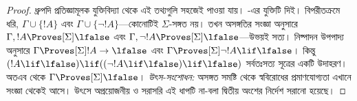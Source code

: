 \documentclass[../../../include/open-logic-section]{subfiles}
\begin{document}
\begin{proof}
  ধ্রুপদি প্রতিজ্ঞামূলক যুক্তিবিদ্যা থেকে এই তথ্যগুলি সহজেই পাওয়া যায়। -এর যুক্তিটি দিই। বিপরীতক্রমে ধরি, $\Gamma \cup \{ !A \}$ এবং $\Gamma \cup \{ \lnot!A \}$—কোনোটিই $\Sigma$-সঙ্গত নয়। তখন অসঙ্গতির সংজ্ঞা অনুসারে $\Gamma, !A \Proves[\Sigma] \lfalse$ এবং $\Gamma, \lnot !A \Proves[\Sigma] \lfalse$—উভয়ই সত্য। নিষ্পাদন উপপাদ্য অনুসারে $\Gamma \Proves[\Sigma] !A \to \lfalse$ এবং $\Gamma \Proves[\Sigma] \lnot!A \lif \lfalse$। কিন্তু $(!A \lif \lfalse) \lif ((\lnot!A \lif \lfalse) \lif \lfalse)$ সর্বতঃসত্য সূত্রের একটি উদাহরণ। অতএব  থেকে $\Gamma \Proves[\Sigma] \lfalse$।
  \emph{উৎস-সংশোধন:} অসঙ্গত সমষ্টি থেকে স্ববিরোধের প্রমাণযোগ্যতা এখানে সংজ্ঞা থেকেই আসে। উৎসে অপ্রয়োজনীয় ও সরাসরি এই ধাপটি না-বলা দ্বিতীয় অংশের নির্দেশ সরানো হয়েছে।
  \end{proof}
\end{document}
